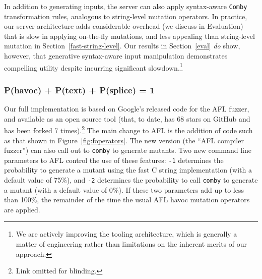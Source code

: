 In addition to generating inputs, the server can also apply syntax-aware
\texttt{Comby} transformation rules, analogous to string-level mutation
operators. In practice, our server architecture adds considerable overhead (we
discuss in Evaluation) that is slow in applying on-the-fly mutations, and less
appealing than string-level mutation in Section~\ref{fast-string-level}. Our
results in Section~\ref{eval} \emph{do} show, however, that generative
syntax-aware input manipulation demonstrates compelling utility despite
incurring significant slowdown.\footnote{We are actively improving the tooling
architecture, which is generally a matter of engineering rather than
limitations on the inherent merits of our approach.}

\subsubsection{P(havoc) + P(text) + P(splice) = 1}

Our full implementation is based on Google's released code for the AFL
fuzzer, and available as an open source tool (that, to date, has 68
stars on GitHub and has been forked 7 times).\footnote{Link omitted for
  blinding.}  The main change to AFL is the addition of code such as that shown in
Figure~\ref{fig:foperators}.  The new version (the ``AFL compiler
fuzzer'') can also call out to {\tt comby} to generate mutants.  Two
new command line parameters to AFL control the use of these features:
{\tt -1} determines the probability to generate a mutant using the
fast C string implementation (with a default value of 75\%), and {\tt -2} determines the probability
to call {\tt comby} to generate a mutant (with a default value of
0\%).  If these two parameters add up to less than 100\%, the
remainder of the time the usual AFL havoc mutation operators are applied.
